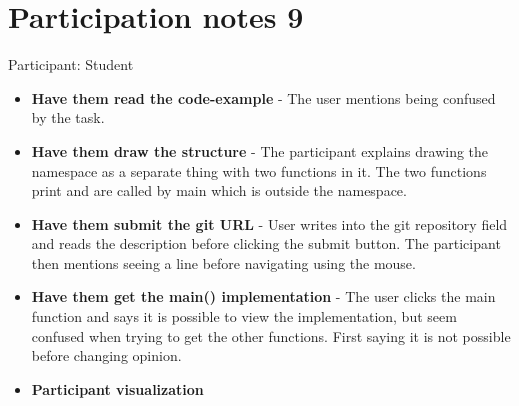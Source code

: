 \section{Participation notes 9}
Participant: Student

\begin{itemize}
    \item \textbf{Have them read the code-example} - The user mentions being confused by the task.
    \item \textbf{Have them draw the structure} - The participant explains drawing the namespace as a separate thing with two functions in it. The two functions print and are called by main which is outside the namespace.
    \item \textbf{Have them submit the git URL} - User writes into the git repository field and reads the description before clicking the submit button. The participant then mentions seeing a line before navigating using the mouse. 
    \item \textbf{Have them get the main() implementation} - The user clicks the main function and says it is possible to view the implementation, but seem confused when trying to get the other functions. First saying it is not possible before changing opinion. 
    \item \textbf{Participant visualization} 
\end{itemize}